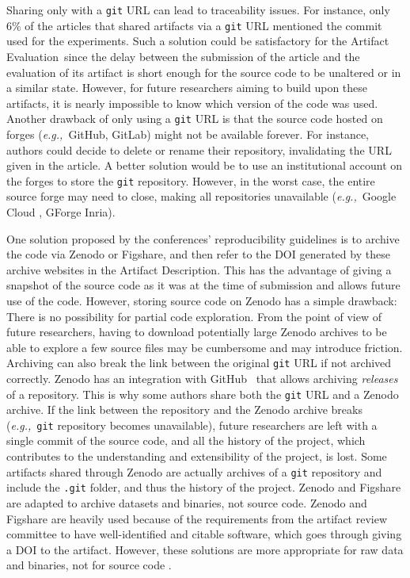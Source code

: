 \documentclass[sigconf,natbib=false]{acmart}
\newcommand{\eg}{\emph{e.g.,}}
\newcommand{\ad}{Artifact Description}
\newcommand{\aeval}{Artifact Evaluation}
\begin{document}
Sharing only with a \texttt{git} URL can lead to traceability issues.
For instance, only 6\% of the articles that shared artifacts via a \texttt{git} URL mentioned the commit used for the experiments.
Such a solution could be satisfactory for the \aeval\ since the delay between the submission of the article and the evaluation of its artifact is short enough for the source code to be unaltered or in a similar state.
However, for future researchers aiming to build upon these artifacts, it is nearly impossible to know which version of the code was used.
Another drawback of only using a \texttt{git} URL is that the source code hosted on forges (\eg\ GitHub, GitLab) might not be available forever.
For instance, authors could decide to delete or rename their repository, invalidating the URL given in the article.
A better solution would be to use an institutional account on the forges to store the \texttt{git} repository.
However, in the worst case, the entire source forge may need to close, making all repositories unavailable (\eg\ Google Cloud \cite{google_code}, GForge Inria).

One solution proposed by the conferences' reproducibility guidelines is to archive the code via Zenodo or Figshare, and then refer to the DOI generated by these archive websites in the \ad.
This has the advantage of giving a snapshot of the source code as it was at the time of submission and allows future use of the code.
However, storing source code on Zenodo has a simple drawback: There is no possibility for partial code exploration.
From the point of view of future researchers, having to download potentially large Zenodo archives to be able to explore a few source files may be cumbersome and may introduce friction.
Archiving can also break the link between the original \texttt{git} URL if not archived correctly.
Zenodo has an integration with GitHub\ \cite{github_zenodo} that allows archiving \emph{releases} of a repository.
This is why some authors share both the \texttt{git} URL and a Zenodo archive.
If the link between the repository and the Zenodo archive breaks (\eg\ \texttt{git} repository becomes unavailable), future researchers are left with a single commit of the source code, and all the history of the project, which contributes to the understanding and extensibility of the project, is lost.
Some artifacts shared through Zenodo are actually archives of a \texttt{git} repository and include the \texttt{.git} folder, and thus the history of the project.
Zenodo and Figshare are adapted to archive datasets and binaries, not source code.
Zenodo and Figshare are heavily used because of the requirements from the artifact review committee to have well-identified and citable software, which goes through giving a DOI to the artifact.
However, these solutions are more appropriate for raw data and binaries, not for source code \cite{alliez2019attributing, software_heritage_2017}.
\end{document}
